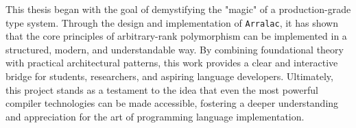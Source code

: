This thesis began with the goal of demystifying the "magic" of a production-grade type system. Through the design and implementation of \texttt{Arralac}, it has shown that the core principles of arbitrary-rank polymorphism can be implemented in a structured, modern, and understandable way. By combining foundational theory with practical architectural patterns, this work provides a clear and interactive bridge for students, researchers, and aspiring language developers. Ultimately, this project stands as a testament to the idea that even the most powerful compiler technologies can be made accessible, fostering a deeper understanding and appreciation for the art of programming language implementation.